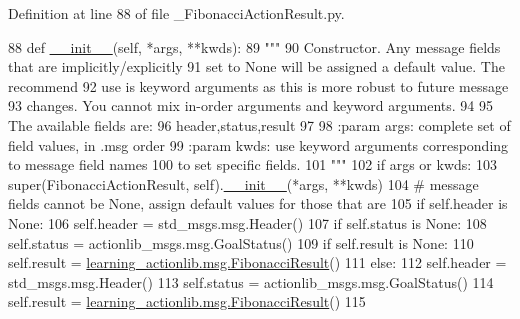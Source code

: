 Definition at line 88 of file \+\_\+\+Fibonacci\+Action\+Result.\+py.


\begin{DoxyCode}
88   \textcolor{keyword}{def }\hyperlink{classstate__machine_1_1Play_a5993a23d8be7f7b2647f71ede0334957}{\_\_init\_\_}(self, *args, **kwds):
89     \textcolor{stringliteral}{"""}
90 \textcolor{stringliteral}{    Constructor. Any message fields that are implicitly/explicitly}
91 \textcolor{stringliteral}{    set to None will be assigned a default value. The recommend}
92 \textcolor{stringliteral}{    use is keyword arguments as this is more robust to future message}
93 \textcolor{stringliteral}{    changes.  You cannot mix in-order arguments and keyword arguments.}
94 \textcolor{stringliteral}{}
95 \textcolor{stringliteral}{    The available fields are:}
96 \textcolor{stringliteral}{       header,status,result}
97 \textcolor{stringliteral}{}
98 \textcolor{stringliteral}{    :param args: complete set of field values, in .msg order}
99 \textcolor{stringliteral}{    :param kwds: use keyword arguments corresponding to message field names}
100 \textcolor{stringliteral}{    to set specific fields.}
101 \textcolor{stringliteral}{    """}
102     \textcolor{keywordflow}{if} args \textcolor{keywordflow}{or} kwds:
103       super(FibonacciActionResult, self).\hyperlink{classstate__machine_1_1Play_a5993a23d8be7f7b2647f71ede0334957}{\_\_init\_\_}(*args, **kwds)
104       \textcolor{comment}{# message fields cannot be None, assign default values for those that are}
105       \textcolor{keywordflow}{if} self.header \textcolor{keywordflow}{is} \textcolor{keywordtype}{None}:
106         self.header = std\_msgs.msg.Header()
107       \textcolor{keywordflow}{if} self.status \textcolor{keywordflow}{is} \textcolor{keywordtype}{None}:
108         self.status = actionlib\_msgs.msg.GoalStatus()
109       \textcolor{keywordflow}{if} self.result \textcolor{keywordflow}{is} \textcolor{keywordtype}{None}:
110         self.result = \hyperlink{classlearning__actionlib_1_1msg_1_1__FibonacciResult_1_1FibonacciResult}{learning\_actionlib.msg.FibonacciResult}()
111     \textcolor{keywordflow}{else}:
112       self.header = std\_msgs.msg.Header()
113       self.status = actionlib\_msgs.msg.GoalStatus()
114       self.result = \hyperlink{classlearning__actionlib_1_1msg_1_1__FibonacciResult_1_1FibonacciResult}{learning\_actionlib.msg.FibonacciResult}()
115 
\end{DoxyCode}



